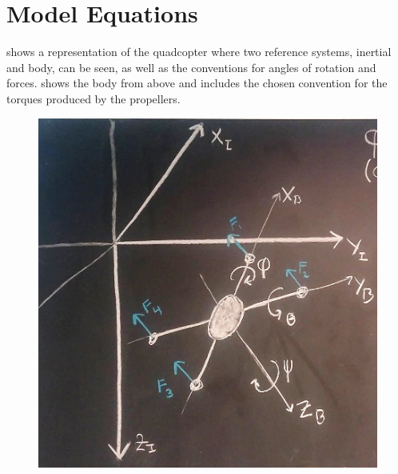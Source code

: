 \section{Model Equations}


 shows a representation of the quadcopter where two reference systems, inertial and body, can be seen, as well as the conventions for angles of rotation and forces.  shows the body from above and includes the chosen convention for the torques produced by the propellers.
 
\begin{minipage}{\linewidth}
	\begin{minipage}{0.45\linewidth}
		\begin{figure}[H]
			\includegraphics[scale=.27]{figures/drone_diagram}
			\centering
			\captionsetup{justification=centering}
			\label{diagramQuad}
		\end{figure}
	\end{minipage}
	\hspace{0.03\linewidth}
	\begin{minipage}{0.45\linewidth}

\end{minipage}
\end{minipage}
